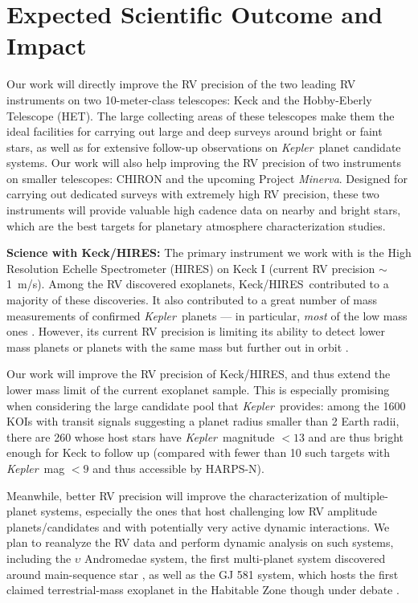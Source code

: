\documentclass[12pt]{article}
\def\mps{m/s}
\def\kepler{{\it Kepler}}
\def\minerva{{\it Minerva}}
\def\keck{Keck/HIRES}
\begin{document}
\vspace{-3pt}
\section{Expected Scientific Outcome and Impact}

Our work will directly improve the RV precision of the two leading RV
instruments on two 10-meter-class telescopes: Keck and the
Hobby-Eberly Telescope (HET). The large collecting areas of these
telescopes make them the ideal facilities for carrying out large and
deep surveys around bright or faint stars, as well as for extensive
follow-up observations on \kepler\ planet candidate systems. Our work
will also help improving the RV precision of two
instruments on smaller telescopes: CHIRON and the upcoming Project
\minerva. Designed for carrying out dedicated surveys with extremely
high RV precision, these two instruments will provide valuable high
cadence data on nearby and bright stars, which are the best targets
for planetary atmosphere characterization studies.

\textbf{Science with \keck: } The primary instrument we work with is
the High Resolution Echelle Spectrometer (HIRES) on Keck I (current RV
precision $\sim$1~\mps). Among the RV discovered exoplanets,
\keck\ contributed to a majority of these discoveries. It also
contributed to a great number of mass measurements of confirmed
\kepler\ planets --- in particular, \textit{most} of the low mass ones
\citep[e.g.,][]{gautier2012,gilliland2013,howard2013,marcy2014}. However,
its current RV precision is limiting its ability to detect lower mass
planets or planets with the same mass but further out in orbit
\citep[e.g.,][]{marcy2014}.

Our work will improve the RV precision of \keck, and thus extend the
lower mass limit of the current exoplanet sample. This is especially
promising when considering the large candidate pool that
\kepler\ provides: among the 1600 KOIs with transit signals suggesting
a planet radius smaller than 2 Earth radii, there are 260 whose host
stars have \kepler\ magnitude $< 13$ and are thus bright enough for
Keck to follow up (compared with fewer than 10 such targets with
\kepler\ mag $< 9$ and thus accessible by HARPS-N).

Meanwhile, better RV precision will improve the characterization of
multiple-planet systems, especially the ones that host challenging low
RV amplitude planets/candidates and with potentially very active
dynamic interactions. We plan to reanalyze the RV data and perform
dynamic analysis on such systems, including the $\upsilon$ Andromedae
system, the first multi-planet system discovered around main-sequence
star \citep{butler1999,wright2009,curiel2011}, as well as the GJ 581
system, which hosts the first claimed terrestrial-mass exoplanet in
the Habitable Zone \citep{vogt2010} though under debate
\citep[e.g.,][]{gregory2011,vogt2012,robertson2013}. 
\end{document}
